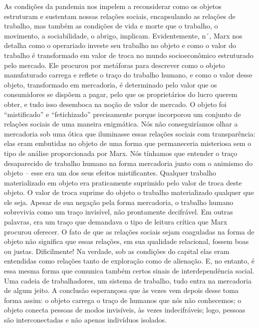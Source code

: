 As condições da pandemia nos impelem a reconsiderar como os objetos
estruturam e sustentam nossas relações sociais, encapsulando as relações
de trabalho, mas também as condições de vida e morte que o trabalho, o
movimento, a sociabilidade, o abrigo, implicam. Evidentemente, n´{}, Marx nos detalha como o operariado investe seu trabalho no
objeto e como o valor do trabalho é transformado em valor de troca no
mundo socioeconômico estruturado pelo mercado. Ele procurou por
metáforas para descrever como o objeto manufaturado carrega e reflete o
traço do trabalho humano, e como o valor desse objeto, transformado em
mercadoria, é determinado pelo valor que os consumidores se dispõem a
pagar, pelo que os proprietários do lucro querem obter, e tudo isso
desemboca na noção de valor de mercado. O objeto foi ``mistificado'' e
``fetichizado'' precisamente porque incorporou um conjunto de relações
sociais de uma maneira enigmática. Nós não conseguiríamos olhar a
mercadoria sob uma ótica que iluminasse essas relações sociais com
transparência: elas eram embutidas no objeto de uma forma que
permaneceria misteriosa sem o tipo de análise proporcionada por Marx.
Nós tínhamos que entender o traço desaparecido de trabalho humano na
forma mercadoria junto com o animismo do objeto -- esse era um dos seus
efeitos mistificantes. Qualquer trabalho materializado em objeto era
praticamente suprimido pelo valor de troca deste objeto. O valor de
troca suprime do objeto o trabalho materializado qualquer que ele seja.
Apesar de sua negação pela forma mercadoria, o trabalho humano
sobrevivia como um traço invisível, não prontamente decifrável. Em
outras palavras, era um traço que demandava o tipo de leitura crítica
que Marx procurou oferecer. O fato de que as relações sociais sejam
coaguladas na forma de objeto não significa que essas relações, em sua
qualidade relacional, fossem boas ou justas. Dificilmente! Na verdade,
sob as condições do capital elas eram entendidas como relações tanto de
exploração como de alienação. E, no entanto, é essa mesma forma que
comunica também certos sinais de interdependência social. Uma cadeia de
trabalhadores, um sistema de trabalho, tudo entra na mercadoria de algum
jeito. A conclusão esperançosa que às vezes vem depois desse
{} toma forma assim: o objeto carrega o traço de humanos que
nós não conhecemos; o objeto conecta pessoas de modos invisíveis, às
vezes indecifráveis; logo, pessoas são interconectadas e não apenas
indivíduos isolados.

